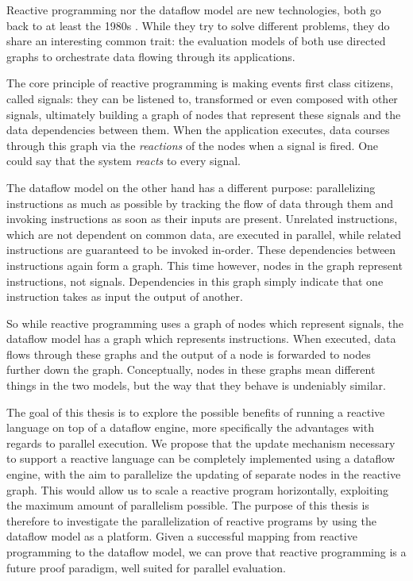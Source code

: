Reactive programming nor the dataflow model are new technologies, both go back to at least the 1980s \citep{harel_development_1985, veen_dataflow_1986}. While they try to solve different problems, they do share an interesting common trait: the evaluation models of both use directed graphs to orchestrate data flowing through its applications. 

The core principle of reactive programming is making events first class citizens, called signals: they can be listened to, transformed or even composed with other signals, ultimately building a graph of nodes that represent these signals and the data dependencies between them. When the application executes, data courses through this graph via the \textit{reactions} of the nodes when a signal is fired. One could say that the system \textit{reacts} to every signal.

The dataflow model on the other hand has a different purpose: parallelizing instructions as much as possible by tracking the flow of data through them and invoking instructions as soon as their inputs are present. Unrelated instructions, which are not dependent on common data, are executed in parallel, while related instructions are guaranteed to be invoked in-order. These dependencies between instructions again form a graph. This time however, nodes in the graph represent instructions, not signals. Dependencies in this graph simply indicate that one instruction takes as input the output of another. 

So while reactive programming uses a graph of nodes which represent signals, the dataflow model has a graph which represents instructions. When executed, data flows through these graphs and the output of a node is forwarded to nodes further down the graph. Conceptually, nodes in these graphs mean different things in the two models, but the way that they behave is undeniably similar.

The goal of this thesis is to explore the possible benefits of running a reactive language on top of a dataflow engine, more specifically the advantages with regards to parallel execution. We propose that the update mechanism necessary to support a reactive language can be completely implemented using a dataflow engine, with the aim to parallelize the updating of separate nodes in the reactive graph. 
This would allow us to scale a reactive program horizontally, exploiting the maximum amount of parallelism possible. The purpose of this thesis is therefore to investigate the parallelization of reactive programs by using the dataflow model as a platform. Given a successful mapping from reactive programming to the dataflow model, we can prove that reactive programming is a future proof paradigm, well suited for parallel evaluation. 

